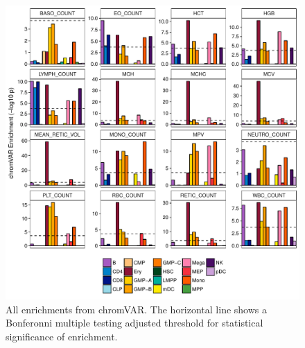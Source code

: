 \documentclass{article}\usepackage[]{graphicx}\usepackage[]{color}
\makeatletter
\def\maxwidth{ %
  \ifdim\Gin@nat@width>\linewidth
    \linewidth
  \else
    \Gin@nat@width
  \fi
}
\newenvironment{knitrout}{}{} %
\makeatother
\begin{document}
\begin{enumerate}[label=(\Alph*)]
\begin{knitrout}
\begin{figure}[H]
{\centering \includegraphics[width=\maxwidth]{figure/allchromVAR-1} 

}

\caption[All enrichments from chromVAR]{All enrichments from chromVAR. The horizontal line shows a Bonferonni multiple testing adjusted threshold for statistical significance of enrichment.}\label{fig:allchromVAR}
\end{figure}


\end{knitrout}

\begin{knitrout}
\color{fgcolor}\begin{figure}[H]


\end{figure}
\end{knitrout}
\end{enumerate}
\end{document}
